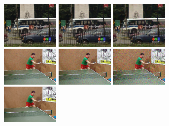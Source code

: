 \documentclass[10pt, journal, twocolumn, final, a4paper]{IEEEtran}
\begin{document}
\begin{figure}[thpb!]
\begin{center}
		\includegraphics[trim=0.0cm 2.0cm 4.0cm 1.0cm, clip=true, width=0.25\textwidth]{figs/bus_s10_bm4d_044.png}
		\includegraphics[trim=0.0cm 2.0cm 4.0cm 1.0cm, clip=true, width=0.25\textwidth]{figs/bus_s20_bm4d_044.png}
		\includegraphics[trim=0.0cm 2.0cm 4.0cm 1.0cm, clip=true, width=0.25\textwidth]{figs/bus_s40_bm4d_044.png}\\
		\includegraphics[trim=3.5cm 2.0cm 1.5cm 0.5cm, clip=true, width=0.25\textwidth]{figs/tennis_nisy_s10_140.png}
		\includegraphics[trim=3.5cm 2.0cm 1.5cm 0.5cm, clip=true, width=0.25\textwidth]{figs/tennis_nisy_s20_140.png}
		\includegraphics[trim=3.5cm 2.0cm 1.5cm 0.5cm, clip=true, width=0.25\textwidth]{figs/tennis_nisy_s40_140.png}\\
		\includegraphics[trim=3.5cm 2.0cm 1.5cm 0.5cm, clip=true, width=0.25\textwidth]{figs/tennis_vnlb_s10_tr2_140.png}

\end{center}
\end{figure}
\end{document}
